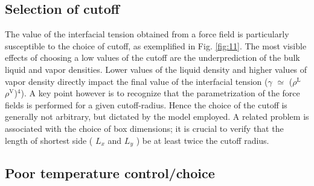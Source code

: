 \documentclass[9pt,bestpractices]{livecoms}
\begin{document}
\subsection{Selection of cutoff}

The value of the interfacial tension obtained from a force field is
particularly susceptible to the choice of cutoff, as exemplified in Fig. \ref{fig:11}.
The most visible effects of choosing a low values of the cutoff are the 
underprediction of the bulk liquid and vapor densities. Lower values of the liquid density
and higher values of vapor density directly impact the final value of the
interfacial tension ({${\gamma}$}  ${\simeq}$ (${\rho}^{\mathrm{L}}$
\textendash{} ${\rho}^{\mathrm{V}}$)$^{4}$).
A key point however is to recognize that the parametrization of the force
fields is performed for a given cutoff-radius. Hence the choice of the cutoff
is generally not arbitrary, but dictated by the model employed. 
A related problem is associated with the choice of box dimensions; it is crucial to verify that the length of shortest side
( $L_{x}$ and $L_{y}$ ) be at least twice the cutoff radius.

\subsection{Poor temperature control/choice}
\end{document}
